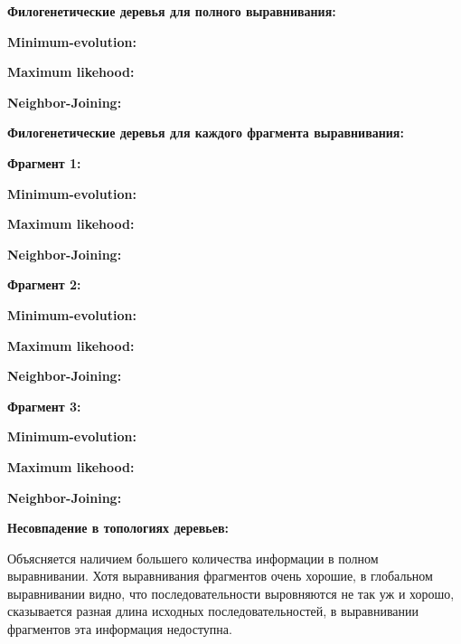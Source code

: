 \documentclass{article} %
\begin{document}
\textbf{Филогенетические деревья для полного выравнивания:}

\textbf{Minimum-evolution:}



\bigskip
\textbf{Maximum likehood:}



\bigskip
\textbf{Neighbor-Joining:}



\bigskip
\textbf{Филогенетические деревья для каждого фрагмента \mbox{выравнивания}:}

\textbf{Фрагмент 1:}

\textbf{Minimum-evolution:}



\bigskip
\textbf{Maximum likehood:}



\bigskip
\textbf{Neighbor-Joining:}



\bigskip
\textbf{Фрагмент 2:}

\textbf{Minimum-evolution:}



\bigskip
\textbf{Maximum likehood:}



\bigskip
\textbf{Neighbor-Joining:}



\bigskip
\textbf{Фрагмент 3:}

\textbf{Minimum-evolution:}



\bigskip
\textbf{Maximum likehood:}



\bigskip
\textbf{Neighbor-Joining:}



\pagebreak
\textbf{Несовпадение в топологиях деревьев:}

Объясняется наличием большего количества информации в полном выравнивании. Хотя выравнивания фрагментов очень хорошие, в глобальном выравнивании видно, что последовательности выровняются не так уж и хорошо, сказывается разная длина исходных последовательностей, в выравнивании фрагментов эта информация недоступна.
\end{document}
